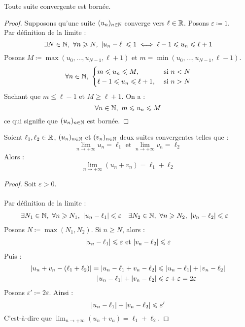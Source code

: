 \begin{theorem}
    Toute suite convergente est bornée.
\end{theorem}

\begin{proof}
    Supposons qu'une suite $(u_n)_{n \in \mathbb{N}}$ converge vers $\ell \in \mathbb{R}$.
    Posons $\varepsilon \coloneqq 1$. 
    \\
    Par définition de la limite :
    \[ \exists N \in \mathbb{N},\ \forall n \geqslant N,\ \abs{u_n - \ell} \leqslant 1 \iff \ell - 1 \leqslant u_n \leqslant \ell + 1 \]
    Posons $M \coloneqq \max(u_0, \ldots, u_{N-1}, \ell + 1)$ et $m = \min(u_0, \ldots, u_{N - 1}, \ell - 1)$.
    \begin{align*}
        \forall n \in \N,\ 
        \begin{cases}
            m \leq u_n \leq M, &\text{ si } n < N \\
            \ell - 1 \leq u_n \leq \ell + 1, &\text{ si } n > N
        \end{cases}
    \end{align*}
    Sachant que $m \leq \ell - 1$ et $M \geq \ell + 1$.
    On a :
    \[ \forall n \in \mathbb{N},\ m \leqslant u_n \leqslant M \]
    ce qui signifie que $(u_n)_{n \in \mathbb{N}}$ est bornée.
\end{proof}

\begin{theorem}
    Soient $\ell_1, \ell_2 \in \mathbb{R}$, $(u_n)_{n \in \mathbb{N}}$ et $(v_n)_{n \in \mathbb{N}}$ deux suites convergentes telles que :
    \[ \lim_{n \to +\infty} u_n = \ell_1 \text{ et } \lim_{n \to +\infty} v_n = \ell_2 \]
    Alors :
    \[ \lim_{n \to +\infty} (u_n + v_n) = \ell_1 + \ell_2 \]
\end{theorem}

\begin{proof}
    Soit $\varepsilon > 0$.
    \\
    \\
    Par définition de la limite :
    \begin{align*}
        &\exists N_1 \in \mathbb{N},\ \forall n \geqslant N_1,\ \abs{u_n - \ell_1} \leqslant \varepsilon &
        &\exists N_2 \in \mathbb{N},\ \forall n \geqslant N_2,\ \abs{v_n - \ell_2} \leqslant \varepsilon
    \end{align*}
    Posons $N \coloneqq \max(N_1, N_2)$. Si $n \geq N$, alors :
    \begin{align*}
        \abs{u_n - \ell_1} \leqslant \varepsilon \text{ et } \abs{v_n - \ell_2} \leqslant \varepsilon
    \end{align*}
    Puis : 
    \begin{align*}
        \abs{u_n + v_n - (\ell_1 + \ell_2)} = \abs{u_n - \ell_1 + v_n - \ell_2} &\leqslant \abs{u_n - \ell_1} + \abs{v_n - \ell_2} \\
        \abs{u_n - \ell_1} + \abs{v_n - \ell_2} &\leqslant \varepsilon + \varepsilon = 2 \varepsilon
    \end{align*}
    Posons $\varepsilon' \coloneqq 2\varepsilon$.
    Ainsi : 
    \[ \abs{u_n - \ell_1} + \abs{v_n - \ell_2} \leqslant \varepsilon' \]
    C'est-à-dire que $\lim_{n \to +\infty} (u_n + v_n) = \ell_1 + \ell_2$.
\end{proof}

